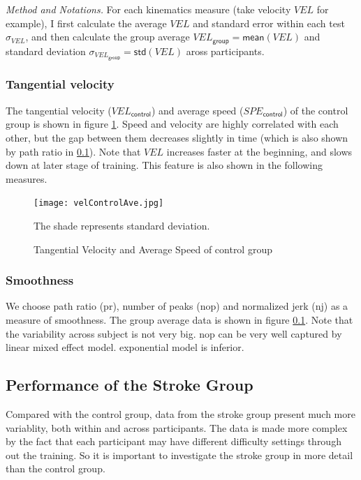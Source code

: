 \textit{Method and Notations.} For each kinematics measure (take velocity $VEL$ for example), I first calculate the average $VEL$ and standard error within each test $\sigma_{VEL}$, and then calculate the group average $VEL_\textsf{group} = \textsf{mean}(VEL)$ and standard deviation $\sigma_{VEL_\textsf{group}} = \textsf{std}(VEL)$ aross participants.

\subsubsection{Tangential velocity}
The tangential velocity ($VEL_\textsf{control}$) and average speed ($SPE_\textsf{control}$) of the control group is shown in figure \ref{fig:velControlAve}. Speed and velocity are highly correlated with each other, but the gap between them decreases slightly in time (which is also shown by path ratio in \ref{}). Note that $VEL$ increases faster at the beginning, and slows down at later stage of training. This feature is also shown in the following measures.

\begin{figure}
	\texttt{[image: velControlAve.jpg]}
	\centering
	\caption{Tangential Velocity and Average Speed of control group}
	\medskip
	\small The shade represents standard deviation.
	\label{fig:velControlAve}
\end{figure}

\subsubsection{Smoothness}
We choose path ratio (pr), number of peaks (nop) and normalized jerk (nj) as a measure of smoothness. The group average data is shown in figure \ref{}. Note that the variability across subject is not very big. nop can be very well captured by linear mixed effect model. exponential model is inferior. 

\subsection{Performance of the Stroke Group}

Compared with the control group, data from the stroke group present much more variablity, both within and across participants. The data is made more complex by the fact that each participant may have different difficulty settings through out the training. So it is important to investigate the stroke group in more detail than the control group.






